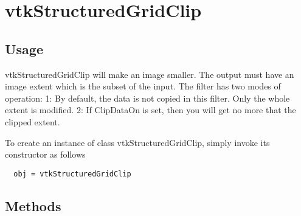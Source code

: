 \section{vtkStructuredGridClip}

\subsection{Usage}

 vtkStructuredGridClip  will make an image smaller.  The output must have
 an image extent which is the subset of the input.  The filter has two 
 modes of operation: 
 1: By default, the data is not copied in this filter. 
 Only the whole extent is modified.  
 2: If ClipDataOn is set, then you will get no more that the clipped
 extent.

To create an instance of class vtkStructuredGridClip, simply
invoke its constructor as follows
\begin{verbatim}
  obj = vtkStructuredGridClip
\end{verbatim}
\subsection{Methods}

